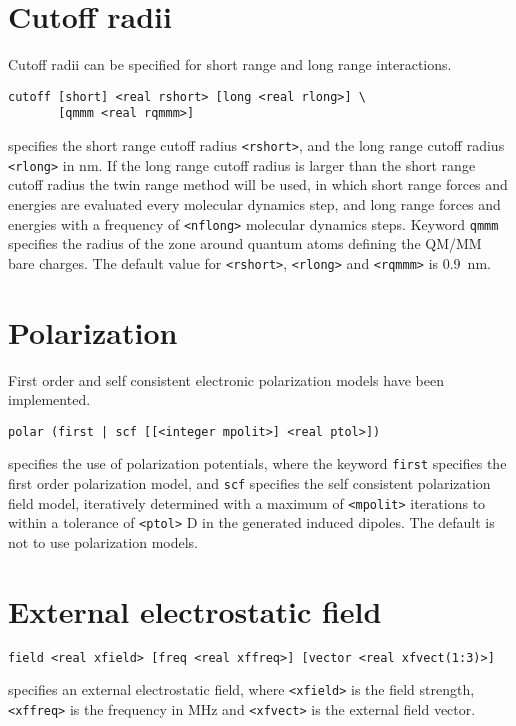\section{Cutoff radii}
Cutoff radii can be specified for short range and long range interactions.
\begin{description}
\item
\begin{verbatim}
cutoff [short] <real rshort> [long <real rlong>] \
       [qmmm <real rqmmm>]
\end{verbatim}
specifies the short range cutoff radius \verb+<rshort>+, and the long range
cutoff radius \verb+<rlong>+ in nm. If the long range cutoff radius
is larger than the short range cutoff radius the twin range method will
be used, in which short range forces and energies are evaluated every
molecular dynamics step, and long range forces and energies with a
frequency of \verb+<nflong>+ molecular dynamics steps. Keyword
\verb+qmmm+ specifies the radius of the zone around quantum atoms
defining the QM/MM bare charges.
The default value for \verb+<rshort>+, \verb+<rlong>+ and \verb+<rqmmm>+ 
is 0.9~nm.
\end{description}

\section{Polarization}
First order and self consistent electronic polarization models have
been implemented.
\begin{description}
\item
\begin{verbatim}
polar (first | scf [[<integer mpolit>] <real ptol>])
\end{verbatim}
specifies the use of polarization potentials,
where the keyword {\tt first} specifies the first order polarization
model, and {\tt scf} specifies the self consistent polarization field
model, iteratively determined with a maximum of \verb+<mpolit>+
iterations to within a tolerance of \verb+<ptol>+ D in the generated
induced dipoles. The default is not to use polarization models.
\end{description}

\section{External electrostatic field}
\begin{description}

\item
\begin{verbatim}
field <real xfield> [freq <real xffreq>] [vector <real xfvect(1:3)>]
\end{verbatim}
specifies an external electrostatic field,
where \verb+<xfield>+ is the field strength, \verb+<xffreq>+ is the
frequency in MHz and \verb+<xfvect>+ is the external field vector.
\end{description}

